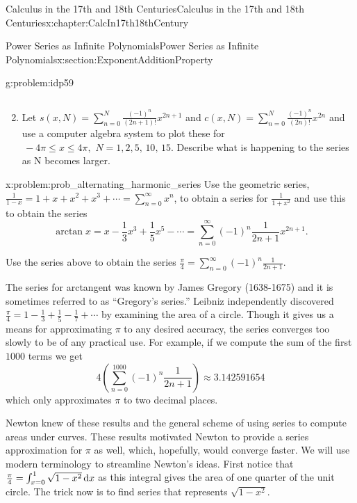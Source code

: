 \begin{chapterptx}{Calculus in the 17th and 18th Centuries}{}{Calculus in the 17th and 18th Centuries}{}{}{x:chapter:CalcIn17th18thCentury}
\begin{sectionptx}{Power Series as Infinite Polynomials}{}{Power Series as Infinite Polynomials}{}{}{x:section:ExponentAdditionProperty}
\begin{problem}{}{g:problem:idp59}
\begin{enumerate}[font=\bfseries,label=(\alph*),ref=\alph*]
\begin{equation*}
				\end{equation*}
				\item{}Let \(s(x,N)=\sum_{n=0}^N\frac{\left(-1\right)^n}{\left(2n+1\right)!}x^{2n+1}\) and \(c(x,N)=\sum_{n=0}^N\frac{\left(-1\right)^n}{\left(2n\right)!}x^{2n}\) and use a computer algebra system to plot these for\(\,-4\pi\leq x\leq 4\pi,\,\,N=1,2,5,\,10,\,15\). Describe what is happening to the series as N becomes larger.%
			\end{enumerate}
		\end{problem}
		\begin{problem}{}{x:problem:prob_alternating_harmonic_series}%
			Use the geometric series, \(\frac{1}{1-x}=1+x+x^2+x^3+\cdots=\sum_{n=0}^\infty x^n\), to obtain a series for \(\frac{1}{1+x^2}\) and use this to obtain the series%
			\begin{equation*}
				\arctan x=x-\frac{1}{3}x^3+\frac{1}{5}x^5-\cdots=\sum_{n=0}^\infty(-1)^n \frac{1}{2n+1}x^{2n+1}\text{.}
			\end{equation*}
			\par
			Use the series above to obtain the series \(\frac{\pi}{4}=\sum_{n=0}^\infty(-1)^n\frac{1}{2n+1}\).%
		\end{problem}
		The series for arctangent was known by James Gregory (1638-1675) and it is sometimes referred to as ``Gregory's series.'' Leibniz independently discovered \(\frac{\pi}{4}=1-\frac{1}{3}+\frac{1}{5}-\frac{1}{7}+\cdots\) by examining the area of a circle.  Though it gives us a means for approximating \(\pi\) to any desired accuracy, the series converges too slowly to be of any practical use.  For example, if we compute the sum of the first \(1000\) terms we get%
		\begin{equation*}
			4\left(\sum_{n=0}^{1000}(-1)^n\frac{1}{2n+1}\right)\approx 3.142591654
		\end{equation*}
		which only approximates \(\pi\) to two decimal places.%
		\par
		Newton  knew of these results and the general scheme of using series to compute areas under curves. These results motivated Newton to provide a series approximation for \(\pi\) as well, which, hopefully, would converge faster. We will use modern terminology to streamline Newton's ideas. First notice that \(\frac{\pi}{4}=\int_{x=0}^1\sqrt{1-x^2}\,{\rm d} x\) as this integral gives the area of one quarter of the unit circle. The trick now is to find series that represents \(\sqrt{1-x^2}\).%
		\par

\end{sectionptx}
\end{chapterptx}
